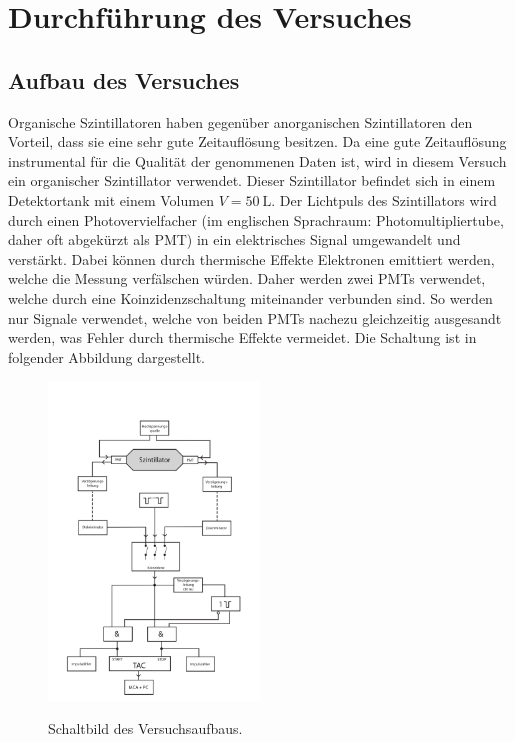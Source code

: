 \section{Durchführung des Versuches}
\label{sec:Durchführung}

\subsection{Aufbau des Versuches}
\label{subsec:Aufbau}

Organische Szintillatoren haben gegenüber anorganischen Szintillatoren den Vorteil, dass sie eine sehr
gute Zeitauflösung besitzen. Da eine gute Zeitauflösung instrumental für die Qualität der genommenen
Daten ist, wird in diesem Versuch ein organischer Szintillator verwendet.
Dieser Szintillator befindet sich in einem Detektortank mit einem Volumen $V = \SI{50}{\liter}$.
Der Lichtpuls des Szintillators wird durch einen Photovervielfacher (im englischen Sprachraum: Photomultipliertube,
daher oft abgekürzt als PMT) in ein elektrisches Signal umgewandelt und verstärkt.
Dabei können durch thermische Effekte Elektronen emittiert werden, welche die
Messung verfälschen würden. Daher werden zwei PMTs verwendet, welche durch eine
Koinzidenzschaltung miteinander verbunden sind. So werden nur Signale verwendet, welche
von beiden PMTs nachezu gleichzeitig ausgesandt werden, was Fehler durch thermische
Effekte vermeidet.
Die Schaltung ist in folgender Abbildung dargestellt.

\begin{figure}
  \centering
    \includegraphics[width=0.5\textwidth]{pictures/Schaltbild.png}
    \label{fig:Schaltbild}
    \caption{Schaltbild des Versuchsaufbaus.}
\end{figure}

